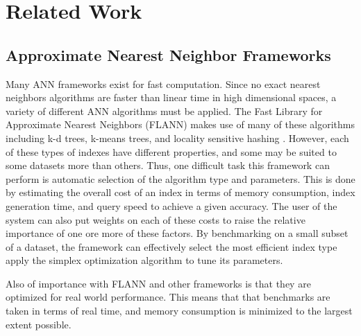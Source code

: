\chapter{Related Work} %

\label{Related Work} %


\section{Approximate Nearest Neighbor Frameworks}

Many ANN frameworks exist for fast computation.  Since no exact nearest neighbors algorithms are faster than linear time in high dimensional spaces, a variety of different ANN algorithms must be applied.  The Fast Library for Approximate Nearest Neighbors (FLANN) makes use of many of these algorithms including k-d trees, k-means trees, and locality sensitive hashing \citep{muja_flann_2009}.  However, each of these types of indexes have different properties, and some may be suited to some datasets more than others.  Thus, one difficult task this framework can perform is automatic selection of the algorithm type and parameters.  This is done by estimating the overall cost of an index in terms of memory consumption, index generation time, and query speed to achieve a given accuracy.  The user of the system can also put weights on each of these costs to raise the relative importance of one ore more of these factors.  By benchmarking on a small subset of a dataset, the framework can effectively select the most efficient index type apply the simplex optimization algorithm \citep{nelder1965simplex} to tune its parameters.

Also of importance with FLANN and other frameworks is that they are optimized for real world performance.  This means that that benchmarks are taken in terms of real time, and memory consumption is minimized to the largest extent possible.  
